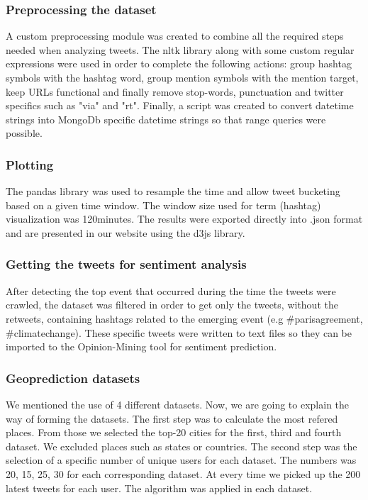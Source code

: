 \documentclass[12pt,svgnames]{report}
\begin{document}
\subsubsection*{Preprocessing the dataset}
A custom preprocessing module was created to combine all the required steps needed when analyzing tweets. The nltk \cite{nltk} library along with some custom regular expressions were used in order to complete the following actions: group hashtag symbols with the hashtag word, group mention symbols with the mention target, keep URLs functional and finally remove stop-words, punctuation and twitter specifics such as "via" and "rt". Finally, a script was created to convert datetime strings into MongoDb specific datetime strings so that range queries were possible.

\subsubsection*{Plotting}
The pandas \cite{pandas} library was used to resample the time and allow tweet bucketing based on a given time window. The window size used for term (hashtag) visualization was 120minutes. The results were exported directly into .json format and are presented in our website \cite{projectwebsite} using the d3js \cite{d3js} library.

\subsubsection*{Getting the tweets for sentiment analysis}
After detecting the top event that occurred during the time the tweets were crawled, the dataset was filtered in order to get only the tweets, without the retweets, containing hashtags related to the emerging event (e.g \#parisagreement, \#climatechange). These specific tweets were written to text files so they can be imported to the Opinion-Mining tool\cite{opinion} for sentiment prediction.

\subsubsection*{Geoprediction datasets}
We mentioned the use of 4 different datasets. Now, we are going to explain the way of forming the datasets. The first step was to calculate the most refered places. From those we selected the top-20 cities for the first, third and fourth dataset. We excluded places such as states or countries. The second step was the selection of a specific number of unique users for each dataset. The numbers was 20, 15, 25, 30 for each corresponding dataset. At every time we picked up the 200 latest tweets for each user. The algorithm was applied in each dataset.
\end{document}
